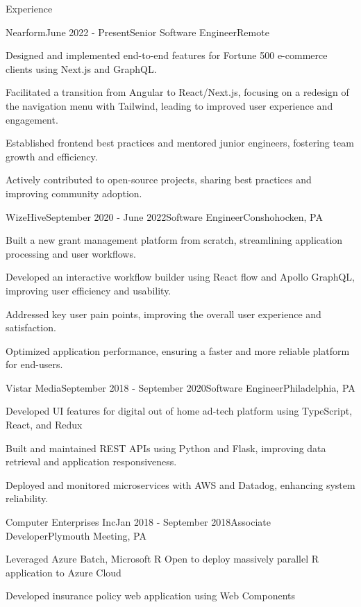 \documentclass{resume} %
\begin{document}
\begin{rSection}{Experience}
\begin{rSubsection}{Nearform}{June 2022 - Present}{Senior Software Engineer}{Remote}
\item Designed and implemented end-to-end features for Fortune 500 e-commerce clients using Next.js and GraphQL.
\item Facilitated a transition from Angular to React/Next.js, focusing on a redesign of the navigation menu with Tailwind, leading to improved user experience and engagement.
\item Established frontend best practices and mentored junior engineers, fostering team growth and efficiency.
\item Actively contributed to open-source projects, sharing best practices and improving community adoption.
\end{rSubsection}

\begin{rSubsection}{WizeHive}{September 2020 - June 2022}{Software Engineer}{Conshohocken, PA}
\item Built a new grant management platform from scratch, streamlining application processing and user workflows.
\item Developed an interactive workflow builder using React flow and Apollo GraphQL, improving user efficiency and usability.
\item Addressed key user pain points, improving the overall user experience and satisfaction.
\item Optimized application performance, ensuring a faster and more reliable platform for end-users.
\end{rSubsection}

\begin{rSubsection}{Vistar Media}{September 2018 - September 2020}{Software Engineer}{Philadelphia, PA}
\item Developed UI features for digital out of home ad-tech platform using TypeScript, React, and Redux
\item Built and maintained REST APIs using Python and Flask, improving data retrieval and application responsiveness.
\item Deployed and monitored microservices with AWS and Datadog, enhancing system reliability.
\end{rSubsection}

\begin{rSubsection}{Computer Enterprises Inc}{Jan 2018 - September 2018}{Associate Developer}{Plymouth Meeting, PA}
\item Leveraged Azure Batch, Microsoft R Open to deploy massively parallel R application to Azure Cloud
\item Developed insurance policy web application using Web Components
\end{rSubsection}


\end{rSection}
\end{document}
